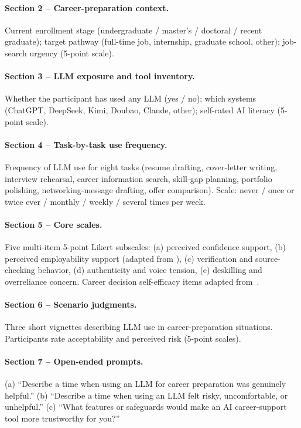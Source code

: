 \documentclass[sigconf,review,anonymous]{acmart}
\begin{document}
\paragraph{Section 2 -- Career-preparation context.}
Current enrollment stage (undergraduate / master's / doctoral / recent graduate); target pathway (full-time job, internship, graduate school, other); job-search urgency (5-point scale).

\paragraph{Section 3 -- LLM exposure and tool inventory.}
Whether the participant has used any LLM (yes / no); which systems (ChatGPT, DeepSeek, Kimi, Doubao, Claude, other); self-rated AI literacy (5-point scale).

\paragraph{Section 4 -- Task-by-task use frequency.}
Frequency of LLM use for eight tasks (resume drafting, cover-letter writing, interview rehearsal, career information search, skill-gap planning, portfolio polishing, networking-message drafting, offer comparison). Scale: never / once or twice ever / monthly / weekly / several times per week.

\paragraph{Section 5 -- Core scales.}
Five multi-item 5-point Likert subscales: (a) perceived confidence support, (b) perceived employability support (adapted from \cite{bennett2022employability}), (c) verification and source-checking behavior, (d) authenticity and voice tension, (e) deskilling and overreliance concern. Career decision self-efficacy items adapted from~\cite{jin2009careerdecision}.

\paragraph{Section 6 -- Scenario judgments.}
Three short vignettes describing LLM use in career-preparation situations. Participants rate acceptability and perceived risk (5-point scales).

\paragraph{Section 7 -- Open-ended prompts.}
(a) ``Describe a time when using an LLM for career preparation was genuinely helpful.'' (b) ``Describe a time when using an LLM felt risky, uncomfortable, or unhelpful.'' (c) ``What features or safeguards would make an AI career-support tool more trustworthy for you?''
\end{document}
